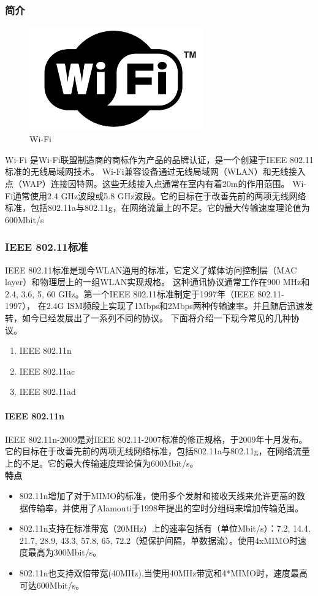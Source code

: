 \documentclass[11pt]{article}
\begin{document}
\subsubsection{简介}
\begin{figure}[H]
    \begin{center}
    \includegraphics[width=0.67\textwidth]{figures//wifi_logo.png}
    \caption{Wi-Fi}
    \end{center}
\end{figure}
Wi-Fi 是Wi-Fi联盟制造商的商标作为产品的品牌认证，是一个创建于IEEE 802.11标准的无线局域网技术。
Wi-Fi兼容设备通过无线局域网（WLAN）和无线接入点（WAP）连接因特网。这些无线接入点通常在室内有着20m的作用范围。
Wi-Fi通常使用2.4 GHz波段或5.8 GHz波段。它的目标在于改善先前的两项无线网络标准，包括802.11a与802.11g，在网络流量上的不足。它的最大传输速度理论值为600Mbit/s
\subsubsection{IEEE 802.11标准}
IEEE 802.11标准是现今WLAN通用的标准，它定义了媒体访问控制层（MAC layer）和物理层上的一组WLAN实现规格。
这种通讯协议通常工作在900 MHz和2.4, 3.6, 5, 60 GHz。第一个IEEE 802.11标准制定于1997年（IEEE 802.11-1997），
在2.4G ISM频段上实现了1Mbps和2Mbps两种传输速率。并且随后迅速发转，如今已经发展出了一系列不同的协议。
下面将介绍一下现今常见的几种协议。
\begin{enumerate}
    \item IEEE 802.11n
    \item IEEE 802.11ac
    \item IEEE 802.11ad
\end{enumerate}
\paragraph{IEEE 802.11n}
IEEE 802.11n-2009是对IEEE 802.11-2007标准的修正规格，于2009年十月发布。
它的目标在于改善先前的两项无线网络标准，包括802.11a与802.11g，在网络流量上的不足。它的最大传输速度理论值为600Mbit/s。
\\
\textbf{特点}
\begin{itemize}
    \item 802.11n增加了对于MIMO的标准，使用多个发射和接收天线来允许更高的数据传输率，并使用了Alamouti于1998年提出的空时分组码来增加传输范围。
    \item 802.11n支持在标准带宽（20MHz）上的速率包括有（单位Mbit/s）：7.2, 14.4, 21.7, 28.9, 43.3, 57.8, 65, 72.2（短保护间隔，单数据流）。使用4xMIMO时速度最高为300Mbit/s。
    \item 802.11n也支持双倍带宽(40MHz),当使用40MHz带宽和4*MIMO时，速度最高可达600Mbit/s。
\end{itemize}
\end{document}
